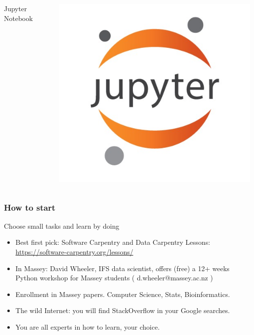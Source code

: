 \documentclass[9pt]{beamer}
\begin{document}
\begin{frame}
\begin{columns}[onlytextwidth]
\begin{exampleblock}{Jupyter Notebook}
\begin{itemize}
      \end{itemize}
    \end{exampleblock}
      \includegraphics[width=0.9\linewidth]{./Figures/software_logos/jupyterLogo.jpg}
  \end{columns}
\end{frame}
\begin{frame}
  \frametitle{How to start}
  \begin{exampleblock}{Choose small tasks and learn by doing}
  \begin{itemize}
    \item Best first pick: Software Carpentry and Data Carpentry Lessons: \url{https://software-carpentry.org/lessons/}
    \item In Massey: David Wheeler, IFS data scientist, offers (free) a 12+ weeks Python workshop for Massey students ( d.wheeler@massey.ac.nz )
    \item Enrollment in Massey papers. Computer Science, Stats, Bioinformatics.
    \item The wild Internet: you will find StackOverflow in your Google searches.
    \item You are all experts in how to learn, your choice.
  \end{itemize}
  \end{exampleblock}
\end{frame}
\end{document}
